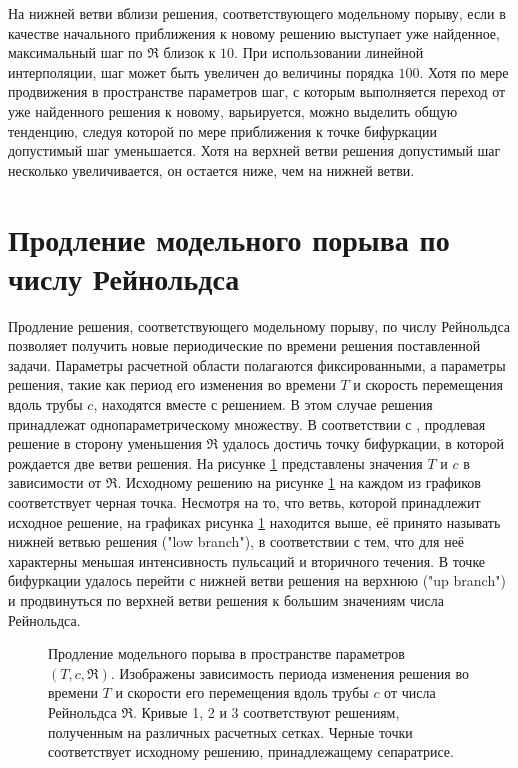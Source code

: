 На нижней ветви вблизи решения, соответствующего модельному порыву, если в качестве начального приближения к новому решению выступает уже найденное, максимальный шаг по $\Re$ близок к $10$. При использовании линейной интерполяции, шаг может быть увеличен до величины порядка $100$. Хотя по мере продвижения в пространстве параметров шаг, с которым выполняется переход от уже найденного решения к новому, варьируется, можно выделить общую тенденцию, следуя которой по мере приближения к точке бифуркации допустимый шаг уменьшается. Хотя на верхней ветви решения допустимый шаг несколько увеличивается, он остается ниже, чем на нижней ветви. 
 

\section{Продление модельного порыва по числу Рейнольдса}

Продление решения, соответствующего модельному порыву, по числу Рейнольдса позволяет получить новые периодические по времени решения поставленной задачи. Параметры расчетной области полагаются фиксированными, а параметры решения, такие как период его изменения во времени $T$ и скорость перемещения вдоль трубы $c$, находятся вместе с решением. В этом случае решения принадлежат однопараметрическому множеству. В соответствии с \cite{Avila2013}, продлевая решение в сторону уменьшения $\Re$ удалось достичь точку бифуркации, в которой рождается две ветви решения. На рисунке \ref{local_contin_pic} представлены значения $T$ и $c$ в зависимости от $\Re$. Исходному решению на рисунке \ref{local_contin_pic} на каждом из графиков соответствует черная точка. Несмотря на то, что ветвь, которой принадлежит исходное решение, на графиках рисунка \ref{local_contin_pic} находится выше, её принято называть нижней ветвью решения ("low branch"), в соответствии с тем, что для неё характерны меньшая интенсивность пульсаций и вторичного течения. В точке бифуркации удалось перейти с нижней ветви решения на верхнюю ("up branch") и продвинуться по верхней ветви решения к большим значениям числа Рейнольдса. 


\begin{figure}
\caption{Продление модельного порыва в пространстве параметров $(T, c, \Re)$. Изображены зависимость периода изменения решения во времени $T$ и скорости его перемещения вдоль трубы $c$ от числа Рейнольдса $\Re$. Кривые 1, 2 и 3 соответствуют решениям, полученным на различных расчетных сетках. Черные точки соответствует исходному решению, принадлежащему сепаратрисе.}
\label{local_contin_pic}
\end{figure}

